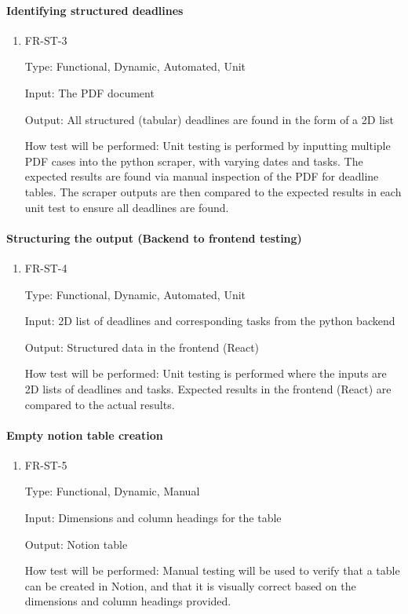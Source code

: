 \documentclass[12pt, titlepage]{article}
\begin{document}
\paragraph{Identifying structured deadlines}

\begin{enumerate}

\item{FR-ST-3\\}

Type: Functional, Dynamic, Automated, Unit 

Input: The PDF document 

Output: All structured (tabular) deadlines are found in the form of a 2D list 

How test will be performed: Unit testing is performed by inputting multiple PDF cases into the python scraper, with varying dates and tasks. The expected results are found via manual inspection of the PDF for deadline tables. The scraper outputs are then compared to the expected results in each unit test to ensure all deadlines are found. 

\end{enumerate}

\paragraph{Structuring the output (Backend to frontend testing)}

\begin{enumerate}

\item{FR-ST-4\\}

Type: Functional, Dynamic, Automated, Unit 

Input: 2D list of deadlines and corresponding tasks from the python backend 

Output: Structured data in the frontend (React) 

How test will be performed: Unit testing is performed where the inputs are 2D lists of deadlines and tasks. Expected results in the frontend (React) are compared to the actual results. 

\end{enumerate}

\paragraph{Empty notion table creation}

\begin{enumerate}

\item{FR-ST-5\\}

Type: Functional, Dynamic, Manual 

Input: Dimensions and column headings for the table 

Output: Notion table 

How test will be performed: Manual testing will be used to verify that a table can be created in Notion, and that it is visually correct based on the dimensions and column headings provided. 

\end{enumerate}
\end{document}
